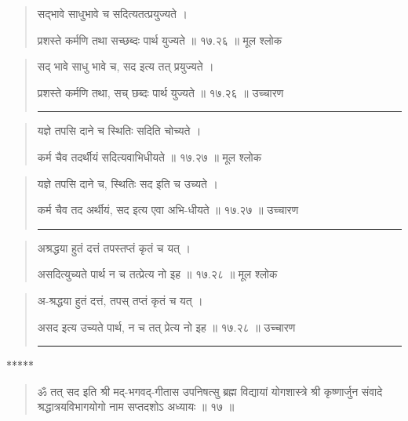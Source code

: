 \begin{quotation}

सद्भावे साधुभावे च सदित्यतत्प्रयुज्यते ।  

प्रशस्ते कर्मणि तथा सच्छब्दः पार्थ युज्यते  ॥ १७.२६ ॥  मूल श्लोक
\end{quotation}

\begin{quotation}

सद् भावे साधु भावे च, सद इत्य तत् प्रयुज्यते ।  

प्रशस्ते कर्मणि तथा, सच् छब्दः पार्थ युज्यते  ॥ १७.२६ ॥  उच्चारण

\noindent\rule{16cm}{0.4pt} 
\end{quotation}


\begin{quotation}

यज्ञे तपसि दाने च स्थितिः सदिति चोच्यते ।  

कर्म चैव तदर्थीयं सदित्यवाभिधीयते  ॥ १७.२७ ॥  मूल श्लोक
\end{quotation}

\begin{quotation}

यज्ञे तपसि दाने च, स्थितिः सद इति च उच्यते ।  

कर्म चैव तद अर्थीयं, सद इत्य एवा अभि-धीयते  ॥ १७.२७ ॥  उच्चारण

\noindent\rule{16cm}{0.4pt} 
\end{quotation}


\begin{quotation}

अश्रद्धया हुतं दत्तं तपस्तप्तं कृतं च यत्‌ ।  

असदित्युच्यते पार्थ न च तत्प्रेत्य नो इह  ॥ १७.२८ ॥  मूल श्लोक
\end{quotation}

\begin{quotation}

अ-श्रद्धया हुतं दत्तं, तपस् तप्तं कृतं च यत्‌ ।  

असद इत्य उच्यते पार्थ, न च तत् प्रेत्य नो इह  ॥ १७.२८ ॥  उच्चारण

\noindent\rule{16cm}{0.4pt} 
\end{quotation}

\begin{center} ***** \end{center}

\begin{quotation}

ॐ तत् सद इति श्री मद्-भगवद्-गीतास उपनिषत्सु ब्रह्म विद्यायां योगशास्त्रे श्री कृष्णार्जुन संवादे  श्रद्धात्रयविभागयोगो नाम सप्तदशोऽ अध्यायः  ॥  १७  ॥ 

\end{quotation} 
